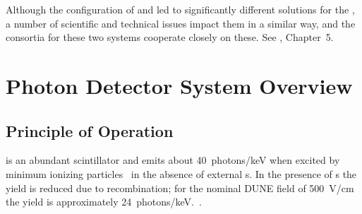 Although the configuration of \single and \dual {} led to significantly different solutions for the , a number of scientific and technical issues impact them in a similar way, and the consortia for these two systems cooperate closely on these. See \voltitledp{}, Chapter~5.





%
%
%

\section{Photon Detector System Overview}
\label{sec:fdsp-pd-overview}



\subsection{Principle of Operation}
\lar is  an abundant scintillator and emits about \SI{40}{photons/keV} when excited  by minimum ionizing particles~\cite{Doke:1990rza} %
in the absence of external \efield{}s. In the presence of \efield{}s the yield is reduced due to recombination; for the nominal DUNE  field of \SI{500}{V/cm} the yield is approximately \SI{24}{photons/keV.}~\cite{PhysRevB.20.3486}. 


